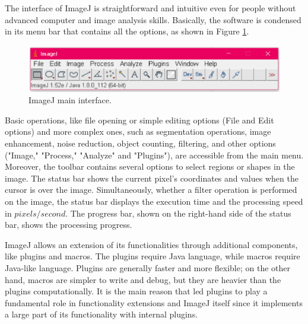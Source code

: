\documentclass[a4paper,12pt]{article}
\begin{document}
The interface of ImageJ is straightforward and intuitive even for people without advanced computer and image analysis skills. 
Basically, the software is condensed in its menu bar that contains all the options, as shown in Figure \ref{ImageJ_Interf}.

\begin{figure}[!t]
	\centerline{\includegraphics[scale=0.37]{Img/Fig1.eps}}
	\caption{ImageJ main interface.}
	\label{ImageJ_Interf}
\end{figure}
Basic operations, like file opening or simple editing options (File and Edit options) and more complex ones, such as segmentation operations, image enhancement, noise reduction, object counting, filtering, and other options ("Image," "Process," "Analyze" and "Plugins"), are accessible from the main menu.
Moreover, the toolbar contains several options to select regions or shapes in the image. 
The status bar shows the current pixel's coordinates and values when the cursor is over the image. Simultaneously, whether a filter operation is performed on the image, the status bar displays the execution time and the processing speed in $pixels / second$.
The progress bar, shown on the right-hand side of the status bar, shows the processing progress.

ImageJ allows an extension of its functionalities through additional components, like plugins and macros. The plugins require Java language, while macros require Java-like language. Plugins are generally faster and more flexible; on the other hand, macros are simpler to write and debug, but they are heavier than the plugins computationally. It is the main reason that led plugins to play a fundamental role in functionality extensions and ImageJ itself since it implements a large part of its functionality with internal plugins.
\end{document}
